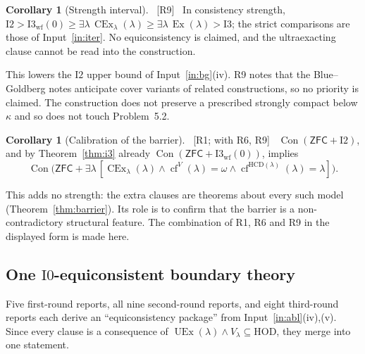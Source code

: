 \documentclass[11pt,letterpaper]{article}
\theoremstyle{definition}
\newtheorem{corollary}[definition]{Corollary}
\numberwithin{equation}{section}
\newcommand{\ZFC}{\mathsf{ZFC}}
\newcommand{\HOD}{\mathrm{HOD}}
\newcommand{\HCD}{\mathrm{HCD}}
\newcommand{\Ex}{\operatorname{Ex}}
\newcommand{\UEx}{\operatorname{UEx}}
\newcommand{\CEx}{\operatorname{CEx}}
\newcommand{\Con}{\operatorname{Con}}
\newcommand{\cf}{\operatorname{cf}}
\newcommand{\Izero}{\mathrm{I0}}
\newcommand{\Itwo}{\mathrm{I2}}
\newcommand{\Ithree}{\mathrm{I3}}
\newcommand{\Iwf}{\mathrm{I3}_{\mathrm{wf}}(0)}
\newcommand{\src}[1]{\unskip\ {\normalfont\small\sffamily\color{Olive}[#1]}\ }
\newcommand{\R}[1]{\textsf{R#1}}
\begin{document}
\begin{corollary}[Strength interval]\label{cor:strength}\src{R9}
In consistency strength, $\Itwo>\Iwf\ge\exists\lambda\,\CEx_\lambda(\lambda)\ge\exists\lambda\,\Ex(\lambda)>\Ithree$; the strict comparisons are those of Input~\ref{in:iter}. No equiconsistency is claimed, and the ultraexacting clause cannot be read into the construction.
\end{corollary}

This lowers the $\Itwo$ upper bound of Input~\ref{in:bg}(iv). \R9 notes that the Blue--Goldberg notes anticipate cover variants of related constructions, so no priority is claimed. The construction does not preserve a prescribed strongly compact below $\kappa$ and so does not touch Problem~5.2.

\begin{corollary}[Calibration of the barrier]\label{cor:calib}\src{R1; with R6, R9}
$\Con(\ZFC+\Itwo)$, and by Theorem~\ref{thm:i3} already $\Con(\ZFC+\Iwf)$, implies
\[
\Con\bigl(\ZFC+\exists\lambda\,[\CEx_\lambda(\lambda)\wedge\cf^V(\lambda)=\omega\wedge\cf^{\HCD(\lambda)}(\lambda)=\lambda]\bigr).
\]
\end{corollary}

This adds no strength: the extra clauses are theorems about every such model (Theorem~\ref{thm:barrier}). Its role is to confirm that the barrier is a non-contradictory structural feature. The combination of \R1, \R6 and \R9 in the displayed form is made here.

\subsection{One \texorpdfstring{$\Izero$}{I0}-equiconsistent boundary theory}

Five first-round reports, all nine second-round reports, and eight third-round reports each derive an ``equiconsistency package'' from Input~\ref{in:abl}(iv),(v). Since every clause is a consequence of $\UEx(\lambda)\wedge V_\lambda\subseteq\HOD$, they merge into one statement.
\end{document}

